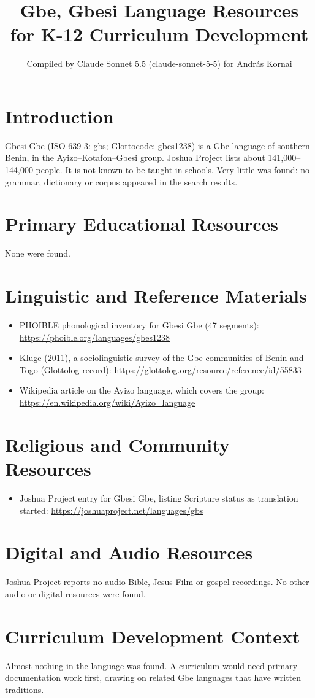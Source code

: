 \documentclass[12pt]{article}
\title{Gbe, Gbesi Language Resources for K-12 Curriculum Development}
\author{Compiled by Claude Sonnet 5.5 (claude-sonnet-5-5) for Andr\'as Kornai}
\date{}
\begin{document}
\maketitle

\section{Introduction}
Gbesi Gbe (ISO 639-3: gbs; Glottocode: gbes1238) is a Gbe language of southern Benin, in the Ayizo--Kotafon--Gbesi group. Joshua Project lists about 141,000--144,000 people. It is not known to be taught in schools. Very little was found: no grammar, dictionary or corpus appeared in the search results.

\section{Primary Educational Resources}
None were found.

\section{Linguistic and Reference Materials}
\begin{itemize}
\item PHOIBLE phonological inventory for Gbesi Gbe (47 segments): \url{https://phoible.org/languages/gbes1238}
\item Kluge (2011), a sociolinguistic survey of the Gbe communities of Benin and Togo (Glottolog record): \url{https://glottolog.org/resource/reference/id/55833}
\item Wikipedia article on the Ayizo language, which covers the group: \url{https://en.wikipedia.org/wiki/Ayizo_language}
\end{itemize}

\section{Religious and Community Resources}
\begin{itemize}
\item Joshua Project entry for Gbesi Gbe, listing Scripture status as translation started: \url{https://joshuaproject.net/languages/gbs}
\end{itemize}

\section{Digital and Audio Resources}
Joshua Project reports no audio Bible, Jesus Film or gospel recordings. No other audio or digital resources were found.

\section{Curriculum Development Context}
Almost nothing in the language was found. A curriculum would need primary documentation work first, drawing on related Gbe languages that have written traditions.
\end{document}
